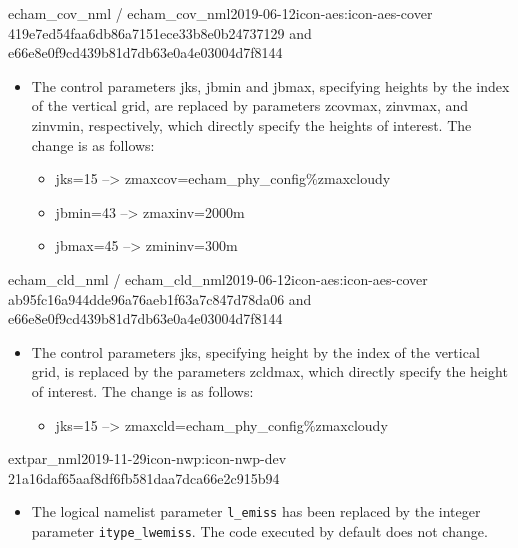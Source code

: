 \begin{changeitem}{echam\_cov\_nml / echam\_cov\_nml}{2019-06-12}{icon-aes:icon-aes-cover 419e7ed54faa6db86a7151ece33b8e0b24737129 and e66e8e0f9cd439b81d7db63e0a4e03004d7f8144}
  \begin{itemize}
   \item The control parameters jks, jbmin and jbmax, specifying heights by the index of the vertical grid, are replaced by parameters zcovmax, zinvmax, and zinvmin, respectively, which directly specify the heights of interest. The change is as follows: \newline
   \begin{itemize}
    \item jks=15 --> zmaxcov=echam\_phy\_config\%zmaxcloudy
    \item jbmin=43 --> zmaxinv=2000m
    \item jbmax=45 --> zmininv=300m
   \end{itemize}
  \end{itemize}
\end{changeitem}

\begin{changeitem}{echam\_cld\_nml / echam\_cld\_nml}{2019-06-12}{icon-aes:icon-aes-cover ab95fc16a944dde96a76aeb1f63a7c847d78da06 and e66e8e0f9cd439b81d7db63e0a4e03004d7f8144}
  \begin{itemize}
   \item The control parameters jks, specifying height by the index of the vertical grid, is replaced by the parameters zcldmax, which directly specify the height of interest. The change is as follows: \newline
   \begin{itemize}
    \item jks=15 --> zmaxcld=echam\_phy\_config\%zmaxcloudy
   \end{itemize}
  \end{itemize}
\end{changeitem}

\begin{changeitem}{extpar\_nml}{2019-11-29}{icon-nwp:icon-nwp-dev 21a16daf65aaf8df6fb581daa7dca66e2c915b94}
  \begin{itemize}
   \item The logical namelist parameter \texttt{l\_emiss} has been replaced by the integer parameter \texttt{itype\_lwemiss}.
     The code executed by default does not change.
  \end{itemize}
\end{changeitem}

